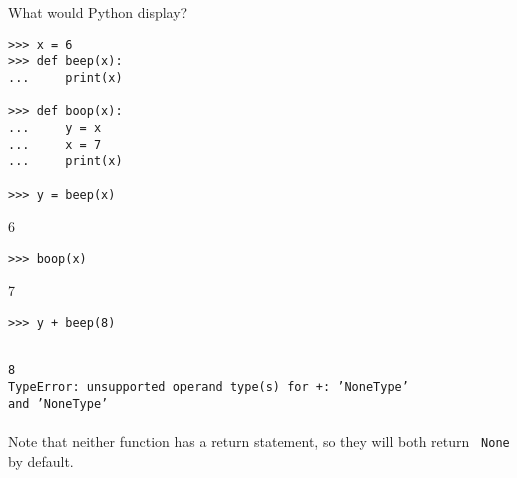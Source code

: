 \question What would Python display?
\begin{lstlisting}
>>> x = 6
>>> def beep(x):
...     print(x)

>>> def boop(x):
...     y = x
...     x = 7
...     print(x)

>>> y = beep(x)
\end{lstlisting}
\begin{solution}
6
\end{solution}
\begin{lstlisting}
>>> boop(x)
\end{lstlisting}
\begin{solution}
7
\end{solution}
\begin{lstlisting}
>>> y + beep(8)
\end{lstlisting}
\begin{solution}
{\tt ~ \\ 8 \\
TypeError: unsupported operand type(s) for +: 'NoneType' \\ and 'NoneType'} \\\\
Note that neither function has a return statement, so they will both return {\tt
None} by default.
\end{solution}
